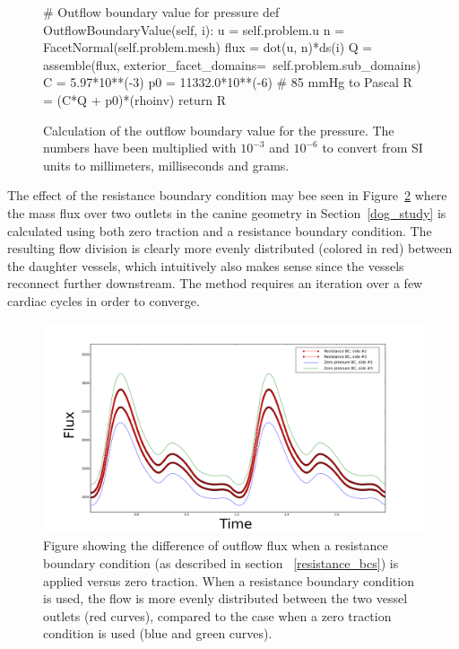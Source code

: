 \begin{figure}
\bwfig
\begin{python}
# Outflow boundary value for pressure
def OutflowBoundaryValue(self, i):
    u = self.problem.u
    n = FacetNormal(self.problem.mesh)
    flux = dot(u, n)*ds(i)
    Q = assemble(flux,
                 exterior_facet_domains=\
                 self.problem.sub_domains)
    C = 5.97*10**(-3)
    p0 = 11332.0*10**(-6) # 85 mmHg to Pascal
    R = (C*Q + p0)*(rhoinv)
    return R
\end{python}
\caption{Calculation of the outflow boundary value for the pressure. The
numbers have been multiplied with $10^{-3}$
and $10^{-6}$ to convert from SI units to millimeters, milliseconds
and grams.}
\label{fig:kvs-2:resistance_code}
\end{figure}

The effect of the resistance boundary condition may bee seen in
Figure~\ref{fig:kvs-2:resistance_bcs_fig} where the mass flux over two
outlets in the canine geometry in Section~\ref{dog_study} is
calculated using both zero traction and a resistance boundary
condition. The resulting flow division is clearly more evenly
distributed (colored in red) between the daughter vessels, which
intuitively also makes sense since the vessels reconnect further
downstream. The method requires an iteration over a few cardiac cycles
in order to converge.

\begin{figure}
\bwfig
  \centering
  \includegraphics[width=\largefig]{chapters/kvs-2/png/zero_dp_vs_res.png}
  \caption{Figure showing the difference of outflow
    flux when a resistance boundary condition (as described in section
    ~\ref{resistance_bcs}) is applied versus zero traction. When a
    resistance boundary condition is used, the flow is more evenly
    distributed between the two vessel outlets (red curves), compared
    to the case when a zero traction condition is used (blue and green
    curves).}
  \label{fig:kvs-2:resistance_bcs_fig}
\end{figure}

